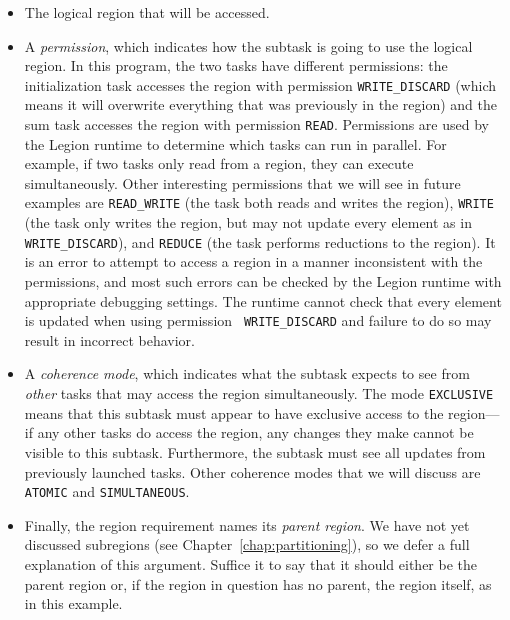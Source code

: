 \documentclass[11pt]{book}
\begin{document}
\begin{itemize}

\item The logical region that will be accessed.

\item A {\em permission}, which indicates how the subtask is going to
  use the logical region.  In this program, the two tasks have
  different permissions: the initialization task accesses the region
  with permission {\tt WRITE\_DISCARD} (which means it will overwrite
  everything that was previously in the region) and the sum task
  accesses the region with permission {\tt READ}.  Permissions are
  used by the Legion runtime to determine which tasks can run in
  parallel.  For example, if two tasks only read from a region, they
  can execute simultaneously.  Other interesting permissions that we
  will see in future examples are {\tt READ\_WRITE} (the task both
  reads and writes the region), {\tt WRITE} (the task only writes the
  region, but may not update every element as in {\tt
    WRITE\_DISCARD}), and {\tt REDUCE} (the task performs reductions
  to the region).  It is an error to attempt to access a region in a
  manner inconsistent with the permissions, and most such errors can be
  checked by the Legion runtime with appropriate debugging settings.
  The runtime cannot check
  that every element is updated when using permission {\tt
    WRITE\_DISCARD} and failure to do so may result in incorrect
  behavior.

\item A {\em coherence mode}, which indicates what the subtask expects to see from {\em other} tasks that may access the
region simultaneously.  The mode {\tt EXCLUSIVE} means that this subtask must appear to have exclusive access to the region---if
any other tasks do access the region, any changes they make cannot be visible to this subtask. Furthermore, the subtask
must see all updates from previously launched tasks. Other coherence modes that we will discuss are {\tt ATOMIC} and
{\tt SIMULTANEOUS}.

\item Finally, the region requirement names its {\em parent region}.
  We have not yet discussed subregions (see
  Chapter~\ref{chap:partitioning}), so we defer a full explanation of
  this argument.  Suffice it to say that it should either be the
  parent region or, if the region in question has no parent, the
  region itself, as in this example.

\end{itemize}
\end{document}
